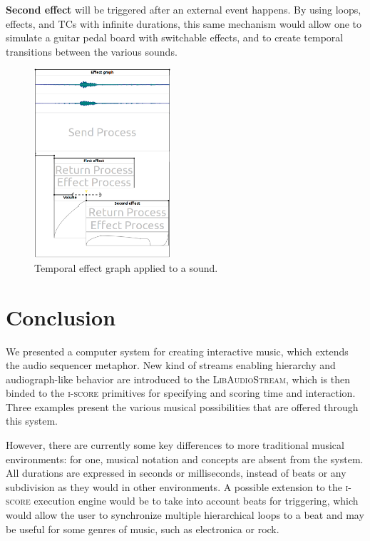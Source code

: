 \documentclass{article}
\newcommand*{\LibAudioStream}{\textsc{LibAudioStream}\xspace}
\newcommand*{\iscore}{\textsc{i-score}\xspace}
\newcommand*{\timeconstraints}{\acp{TC}\xspace}
\begin{document}
\textbf{Second effect} will be triggered after an external event happens.
By using loops, effects, and \timeconstraints with infinite durations, this same mechanism would allow one to simulate a guitar pedal board with switchable effects, and to create temporal transitions between the various sounds.

\begin{figure}[h]
    \centering
    \includegraphics[width=0.45\textwidth]{figures/ex3.png}
    \caption{Temporal effect graph applied to a sound.}
    \label{fig.score3}
\end{figure}
\newpage
\section{Conclusion}
We presented a computer system for creating interactive music, which extends the audio sequencer metaphor.
New kind of streams enabling hierarchy and audiograph-like behavior are introduced to the \LibAudioStream, which is then binded to the \iscore primitives for specifying and scoring time and interaction.
Three examples present the various musical possibilities that are offered
through this system.

However, there are currently some key differences to more traditional musical environments: for one, musical notation and concepts are absent from the system.
All durations are expressed in seconds or milliseconds, instead of beats or any subdivision as they would in other environments. 
A possible extension to the \iscore execution engine would be to take into account beats for triggering, which would allow the user to synchronize multiple hierarchical loops to a beat and may be useful for some genres of music, such as electronica or rock.
\end{document}
